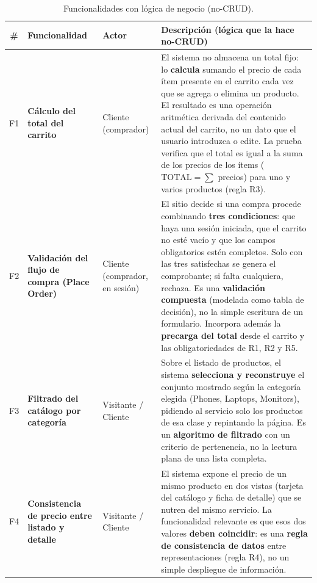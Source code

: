 \begingroup
\footnotesize
\setlength{\tabcolsep}{4pt}
\renewcommand{\arraystretch}{1.2}
\begin{table}[htb]\centering\footnotesize
\caption{Funcionalidades con lógica de negocio (no-CRUD).}\label{tab:funcionalidades}
\begin{tabularx}{\textwidth}{@{}c L{2.4cm} L{2.2cm} Y@{}}
\toprule
\textbf{\#} & \textbf{Funcionalidad} & \textbf{Actor} & \textbf{Descripción (lógica que la hace no-CRUD)} \\
\midrule
F1 & \textbf{Cálculo del total del carrito} & Cliente (comprador) &
El sistema no almacena un total fijo: lo \textbf{calcula} sumando el precio de cada
ítem presente en el carrito cada vez que se agrega o elimina un producto. El resultado
es una operación aritmética derivada del contenido actual del carrito, no un dato que
el usuario introduzca o edite. La prueba verifica que el total es igual a la suma de
los precios de los ítems ($\mathrm{TOTAL} = \sum$ precios) para uno y varios
productos (regla R3). \\
F2 & \textbf{Validación del flujo de compra (Place Order)} & Cliente (comprador, en sesión) &
El sitio decide si una compra procede combinando \textbf{tres condiciones}: que haya
una sesión iniciada, que el carrito no esté vacío y que los campos obligatorios estén
completos. Solo con las tres satisfechas se genera el comprobante; si falta cualquiera,
rechaza. Es una \textbf{validación compuesta} (modelada como tabla de decisión), no la
simple escritura de un formulario. Incorpora además la \textbf{precarga del total}
desde el carrito y las obligatoriedades de R1, R2 y R5. \\
F3 & \textbf{Filtrado del catálogo por categoría} & Visitante / Cliente &
Sobre el listado de productos, el sistema \textbf{selecciona y reconstruye} el conjunto
mostrado según la categoría elegida (Phones, Laptops, Monitors), pidiendo al servicio
solo los productos de esa clase y repintando la página. Es un \textbf{algoritmo de
filtrado} con un criterio de pertenencia, no la lectura plana de una lista completa. \\
F4 & \textbf{Consistencia de precio entre listado y detalle} & Visitante / Cliente &
El sistema expone el precio de un mismo producto en dos vistas (tarjeta del catálogo y
ficha de detalle) que se nutren del mismo servicio. La funcionalidad relevante es que
esos dos valores \textbf{deben coincidir}: es una \textbf{regla de consistencia de
datos} entre representaciones (regla R4), no un simple despliegue de información. \\
\bottomrule
\end{tabularx}
\end{table}
\endgroup

